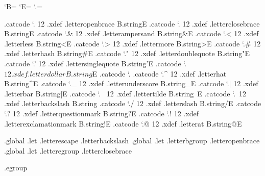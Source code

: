 

\unprotect


\newif\ifeightbitcharacters  \eightbitcharacterstrue


\bgroup

\catcode`B=\@@begingroup
\catcode`E=\@@endgroup
\catcode`.=\@@escape

.catcode `.{ 12 .xdef .letteropenbrace       B.string{E
.catcode `.} 12 .xdef .letterclosebrace      B.string}E
.catcode `.& 12 .xdef .letterampersand       B.string&E
.catcode `.< 12 .xdef .letterless            B.string<E
.catcode `.> 12 .xdef .lettermore            B.string>E
.catcode `.# 12 .xdef .letterhash            B.string#E
.catcode `." 12 .xdef .letterdoublequote     B.string"E
.catcode `.' 12 .xdef .lettersinglequote     B.string'E
.catcode `.$ 12 .xdef .letterdollar          B.string$E
.catcode `.%
.catcode `.^ 12 .xdef .letterhat             B.string^E
.catcode `._ 12 .xdef .letterunderscore      B.string_E
.catcode `.| 12 .xdef .letterbar             B.string|E
.catcode `.~ 12 .xdef .lettertilde           B.string~E
.catcode `.\ 12 .xdef .letterbackslash       B.string\E
.catcode `./ 12 .xdef .letterslash           B.string/E
.catcode `.? 12 .xdef .letterquestionmark    B.string?E
.catcode `.! 12 .xdef .letterexclamationmark B.string!E
.catcode `.@ 12 .xdef .letterat              B.string@E

         .global .let .letterescape .letterbackslash
         .global .let .letterbgroup .letteropenbrace
         .global .let .letteregroup .letterclosebrace

.egroup

\protect \endinput
